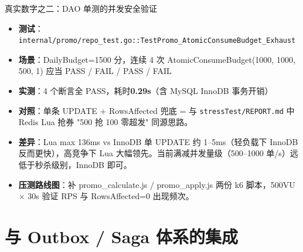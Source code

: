 \documentclass[aspectratio=169,11pt]{beamer}
\begin{document}
\begin{frame}[shrink]{真实数字之二：DAO 单测的并发安全验证}
\begin{itemize}
  \item \textbf{测试}：\texttt{internal/promo/repo\_test.go::TestPromo\_AtomicConsumeBudget\_Exhaust}
  \item \textbf{场景}：DailyBudget=1500 分，连续 4 次 AtomicConsumeBudget(1000, 1000, 500, 1) 应当 PASS / FAIL / PASS / FAIL
  \item \textbf{实测}：4 个断言全 PASS，耗时\textbf{0.29s}（含 MySQL InnoDB 事务开销）
  \item \textbf{对照}：单条 UPDATE + RowsAffected 兜底 = 与 \texttt{stressTest/REPORT.md} 中 Redis Lua 抢券 "500 抢 100 零超发" 同源思路。
  \item \textbf{差异}：Lua max 136ms vs InnoDB 单 UPDATE 约 1--5ms（轻负载下 InnoDB 反而更快），高竞争下 Lua 大幅领先。当前满减并发量级（500--1000 单/s）远低于秒杀级别，InnoDB 即可。
  \item \textbf{压测路线图}：补 promo\_calculate.js / promo\_apply.js 两份 k6 脚本，500VU × 30s 验证 RPS 与 RowsAffected=0 出现频次。
\end{itemize}
\end{frame}

\section{与 Outbox / Saga 体系的集成}
\end{document}
